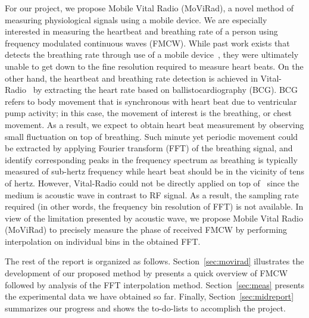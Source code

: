 %
%

For our project, we propose Mobile Vital Radio (MoViRad), a novel method of measuring physiological signals using a mobile device. We are especially interested in measuring the heartbeat and breathing rate of a person using frequency modulated continuous waves (FMCW). While past work exists that detects the breathing rate through use of a mobile device~\cite{nandakumar_mobisys15}, they were ultimately unable to get down to the fine resolution required to measure heart beats. On the other hand, the heartbeat and breathing rate detection is achieved in Vital-Radio~\cite{Adib_acm15} by extracting the heart rate based on ballistocardiography (BCG). BCG refers to body movement that is synchronous with heart beat due to ventricular pump activity; in this case, the movement of interest is the breathing, or chest movement. As a result, we expect to obtain heart beat measurement by observing small fluctuation on top of breathing. Such minute yet periodic movement could be extracted by applying Fourier transform (FFT) of the breathing signal, and identify corresponding peaks in the frequency spectrum as breathing is typically measured of sub-hertz frequency while heart beat should be in the vicinity of tens of hertz. However, Vital-Radio could not be directly applied on top of~\cite{nandakumar_mobisys15} since the medium is acoustic wave in contrast to RF signal. As a result, the sampling rate required (in other words, the frequency bin resolution of FFT) is not available. In view of the limitation presented by acoustic wave, we propose Mobile Vital Radio (MoViRad) to precisely measure the phase of received FMCW by performing interpolation on individual bins in the obtained FFT. 

The rest of the report is organized as follows. Section~\ref{sec:movirad} illustrates the development of our proposed method by presents a quick overview of FMCW followed by analysis of the FFT interpolation method. Section~\ref{sec:meas} presents the experimental data we have obtained so far. Finally, Section~\ref{sec:midreport} summarizes our progress and shows the to-do-lists to accomplish the project.